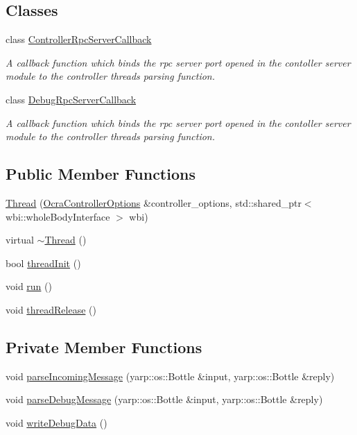 \subsection*{Classes}
\begin{DoxyCompactItemize}
\item 
class \hyperlink{classThread_1_1ControllerRpcServerCallback}{Controller\+Rpc\+Server\+Callback}
\begin{DoxyCompactList}\small\item\em A callback function which binds the rpc server port opened in the contoller server module to the controller thread\textquotesingle{}s parsing function. \end{DoxyCompactList}\item 
class \hyperlink{classThread_1_1DebugRpcServerCallback}{Debug\+Rpc\+Server\+Callback}
\begin{DoxyCompactList}\small\item\em A callback function which binds the rpc server port opened in the contoller server module to the controller thread\textquotesingle{}s parsing function. \end{DoxyCompactList}\end{DoxyCompactItemize}
\subsection*{Public Member Functions}
\begin{DoxyCompactItemize}
\item 
\hyperlink{classThread_a7494a3cf676527432ee724d59ed9ee8f}{Thread} (\hyperlink{classOcraControllerOptions}{Ocra\+Controller\+Options} \&controller\+\_\+options, std\+::shared\+\_\+ptr$<$ wbi\+::whole\+Body\+Interface $>$ wbi)
\item 
virtual \hyperlink{classThread_a37d9edd3a1a776cbc27dedff949c9726}{$\sim$\+Thread} ()
\item 
bool \hyperlink{classThread_a1e840470cd71d7bfb2430d24169e3dce}{thread\+Init} ()
\item 
void \hyperlink{classThread_ad9373d8d725c46717dfce3130018fe3a}{run} ()
\item 
void \hyperlink{classThread_aa2856c7d45670f45d66bcb319255defe}{thread\+Release} ()
\end{DoxyCompactItemize}
\subsection*{Private Member Functions}
\begin{DoxyCompactItemize}
\item 
void \hyperlink{classThread_ae21029d250ac7c720f2411eab71a9414}{parse\+Incoming\+Message} (yarp\+::os\+::\+Bottle \&input, yarp\+::os\+::\+Bottle \&reply)
\item 
void \hyperlink{classThread_a6ce5ef9684cb2793be85e7402ad672f0}{parse\+Debug\+Message} (yarp\+::os\+::\+Bottle \&input, yarp\+::os\+::\+Bottle \&reply)
\item 
void \hyperlink{classThread_a9af0e98aa9b1de2f5c7bfa2f6e5001a2}{write\+Debug\+Data} ()
\end{DoxyCompactItemize}

